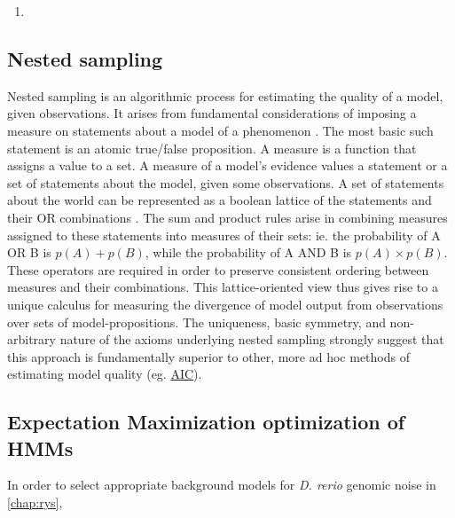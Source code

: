 \begin{enumerate}
    \item 
\end{enumerate}

\subsection{Nested sampling}
\label{ssec:nested}
Nested sampling is an algorithmic process for estimating the quality of a model, given observations. It arises from fundamental considerations of imposing a measure on statements about a model of a phenomenon \cite{Skilling2012}. The most basic such statement is an atomic true/false proposition. A measure is a function that assigns a value to a set. A measure of a model's evidence values a statement or a set of statements about the model, given some observations. A set of statements about the world can be represented as a boolean lattice of the statements and their OR combinations \cite{Knuth2012}. The sum and product rules arise in combining measures assigned to these statements into measures of their sets: ie. the probability of A OR B is $p(A) + p(B)$, while the probability of A AND B is $p(A) \times p(B)$. These operators are required in order to preserve consistent ordering between measures and their combinations. This lattice-oriented view thus gives rise to a unique calculus for measuring the divergence of model output from observations over sets of model-propositions\cite{Knuth2012}. The uniqueness, basic symmetry, and non-arbitrary nature of the axioms underlying nested sampling strongly suggest that this approach is fundamentally superior to other, more ad hoc methods of estimating model quality (eg. \hyperref[ssec:AIC]{AIC}).





\subsection{Expectation Maximization optimization of HMMs}
\label{ssec:EM}
In order to select appropriate background models for \textit{D. rerio} genomic noise in \autoref{chap:rys}, 
